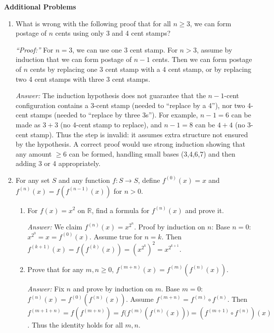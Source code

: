 \documentclass[11pt]{article}
\begin{document}
\pagebreak
\noindent \textbf{Additional Problems}
\begin{enumerate}
    \item What is wrong with the following proof that for all $n \ge 3$, we can form postage of $n$ cents using only 3 and 4 cent stamps?

    \medskip
    \noindent\emph{“Proof:”} For $n = 3$, we can use one 3 cent stamp. For $n > 3$, assume by induction that we can form postage of $n-1$ cents. Then we can form postage of $n$ cents by replacing one 3 cent stamp with a 4 cent stamp, or by replacing two 4 cent stamps with three 3 cent stamps.

    \medskip\emph{Answer: }
    The induction hypothesis does not guarantee that the $n-1$-cent configuration contains a 3-cent stamp (needed to “replace by a 4”), nor two 4-cent stamps (needed to “replace by three 3s”). For example, $n-1=6$ can be made as $3+3$ (no 4-cent stamp to replace), and $n-1=8$ can be $4+4$ (no 3-cent stamp). Thus the step is invalid: it assumes extra structure not ensured by the hypothesis. A correct proof would use strong induction showing that any amount $\ge 6$ can be formed, handling small bases (3,4,6,7) and then adding 3 or 4 appropriately.

    \item For any set $S$ and any function $f: S \to S$, define $f^{(0)}(x)=x$ and $f^{(n)}(x)=f(f^{(n-1)}(x))$ for $n>0$.
    \begin{enumerate}[label=(\alph*)]
        \item For $f(x)=x^2$ on $\mathbb{R}$, find a formula for $f^{(n)}(x)$ and prove it.

        \emph{Answer: } We claim $f^{(n)}(x)=x^{2^n}$. Proof by induction on $n$: Base $n=0$: $x^{2^0}=x=f^{(0)}(x)$. Assume true for $n=k$. Then $f^{(k+1)}(x)=f(f^{(k)}(x))=(x^{2^k})^2=x^{2^{k+1}}$.

        \item Prove that for any $m,n\ge0$, $f^{(m+n)}(x)=f^{(m)}(f^{(n)}(x))$.

        \emph{Answer: } Fix $n$ and prove by induction on $m$. Base $m=0$: $f^{(n)}(x)=f^{(0)}(f^{(n)}(x))$. Assume $f^{(m+n)}=f^{(m)}\circ f^{(n)}$. Then $f^{(m+1+n)}=f(f^{(m+n)})=f\big(f^{(m)}(f^{(n)}(x))\big)=(f^{(m+1)}\circ f^{(n)})(x)$. Thus the identity holds for all $m,n$.
    \end{enumerate}
\end{enumerate}
\end{document}
